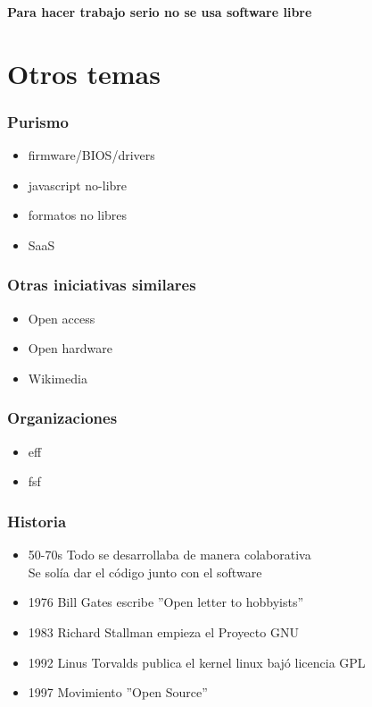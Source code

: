 \documentclass{beamer}
\begin{document}
\begin{frame}
    \begin{center}
        \textbf{Para hacer trabajo serio no se usa software libre}
    \end{center}
\end{frame}

\section{Otros temas}

\begin{frame}\frametitle{Purismo}
    \begin{itemize}
        \item firmware/BIOS/drivers
        \item javascript no-libre
        \item formatos no libres
        \item SaaS
    \end{itemize}
\end{frame}

\begin{frame}\frametitle{Otras iniciativas similares}
    \begin{itemize}
        \item Open access
        \item Open hardware
        \item Wikimedia
    \end{itemize}
\end{frame}

\begin{frame}\frametitle{Organizaciones}
    \begin{itemize}
        \item eff
        \item fsf
    \end{itemize}
\end{frame}

\begin{frame}\frametitle{Historia}
    \begin{itemize}
        \item 50-70s Todo se desarrollaba de manera colaborativa \\
              Se solía dar el código junto con el software
        \item 1976 Bill Gates escribe ''Open letter to hobbyists''
        \item 1983 Richard Stallman empieza el Proyecto GNU
        \item 1992 Linus Torvalds publica el kernel linux bajó licencia GPL
        \item 1997 Movimiento ''Open Source''
    \end{itemize}
\end{frame}
\end{document}
